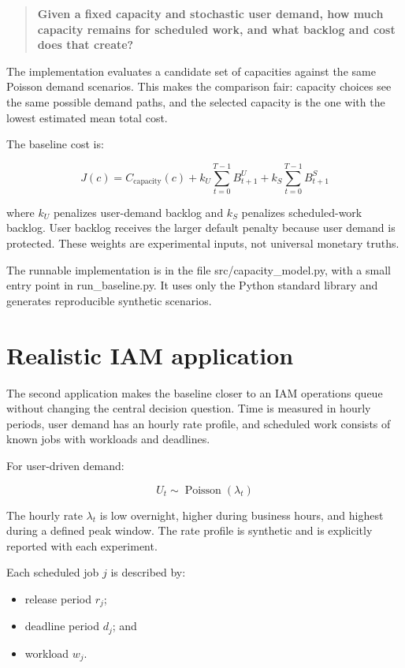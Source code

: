 \documentclass[11pt,a4paper]{article}
\newcommand{\equationnote}[1]{\begin{center}\colorbox{boxblue}{\parbox{0.92\linewidth}{\begin{equation*}#1\end{equation*}}}\end{center}}
\begin{document}
\begin{quote}\textbf{Given a fixed capacity and stochastic user demand, how much capacity remains for scheduled work, and what backlog and cost does that create?}\end{quote}

The implementation evaluates a candidate set of capacities against the same
Poisson demand scenarios. This makes the comparison fair: capacity choices see
the same possible demand paths, and the selected capacity is the one with the
lowest estimated mean total cost.

The baseline cost is:

\equationnote{J(c) = C_{\text{capacity}}(c) + k_U \sum_{t=0}^{T-1} B^U_{t+1} + k_S \sum_{t=0}^{T-1} B^S_{t+1}}

where $k_U$ penalizes user-demand backlog and $k_S$ penalizes scheduled-work
backlog. User backlog receives the larger default penalty because user demand
is protected. These weights are experimental inputs, not universal monetary
truths.

The runnable implementation is in the file src/capacity\_model.py, with a small entry
point in run\_baseline.py. It uses only the Python standard library and
generates reproducible synthetic scenarios.

\clearpage
\section{Realistic IAM application}

The second application makes the baseline closer to an IAM operations queue
without changing the central decision question. Time is measured in hourly
periods, user demand has an hourly rate profile, and scheduled work consists
of known jobs with workloads and deadlines.

For user-driven demand:

\equationnote{U_t \sim \operatorname{Poisson}(\lambda_t)}

The hourly rate $\lambda_t$ is low overnight, higher during business hours,
and highest during a defined peak window. The rate profile is synthetic and is
explicitly reported with each experiment.

Each scheduled job $j$ is described by:

\begin{itemize}
  \item release period $r_j$;
  \item deadline period $d_j$; and
  \item workload $w_j$.
\end{itemize}
\end{document}

